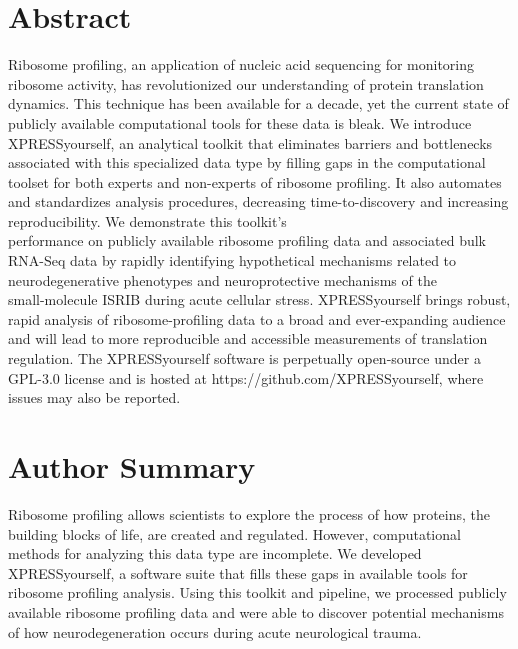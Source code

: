 \documentclass[10pt, oneside]{article}
\begin{document}
\section*{Abstract}
\noindent
Ribosome profiling, an application of nucleic acid sequencing for monitoring ribosome activity, has revolutionized our understanding of protein translation dynamics. This technique has been available for a decade, yet the current state of publicly available computational tools for these data is bleak. We introduce XPRESSyourself, an analytical toolkit that eliminates barriers and bottlenecks associated with this specialized data type by filling gaps in the computational toolset for both experts and non-experts of ribosome profiling. It also automates and standardizes analysis procedures, decreasing time-to-discovery and increasing reproducibility. We demonstrate this toolkit's \\performance on publicly available ribosome profiling data and associated bulk RNA-Seq data by rapidly identifying hypothetical mechanisms related to neurodegenerative phenotypes and neuroprotective mechanisms of the \\small-molecule ISRIB during acute cellular stress. XPRESSyourself brings robust, rapid analysis of ribosome-profiling data to a broad and ever-expanding audience and will lead to more reproducible and accessible measurements of translation regulation. The XPRESSyourself software is perpetually open-source under a GPL-3.0 license and is hosted at https://github.com/XPRESSyourself, where issues may also be reported.\\

\section*{Author Summary}
\noindent
Ribosome profiling allows scientists to explore the process of how proteins, the building blocks of life, are created and regulated. However, computational methods for analyzing this data type are incomplete. We developed XPRESSyourself, a software suite that fills these gaps in available tools for ribosome profiling analysis. Using this toolkit and pipeline, we processed publicly available ribosome profiling data and were able to discover potential mechanisms of how neurodegeneration occurs during acute neurological trauma.\\

\setlength{\parindent}{2em}

\end{document}
